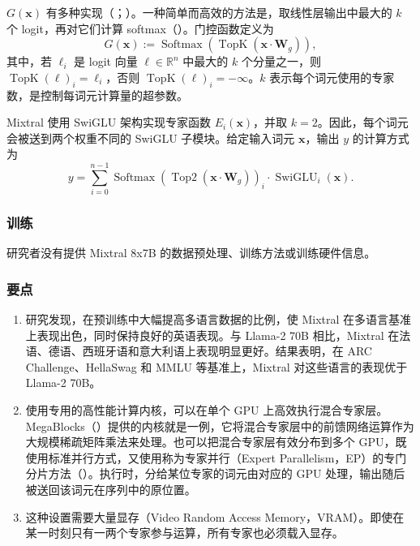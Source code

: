 $G(\symbf{x})$ 有多种实现（；）。一种简单而高效的方法是，取线性层输出中最大的 $k$ 个 logit，再对它们计算 softmax（）。门控函数定义为
\begin{equation}
G(\symbf{x}):=\operatorname{Softmax}(\operatorname{TopK}(\symbf{x}\cdot\symbf{W}_g)),
\tag{2.40}
\end{equation}
其中，若 $\ell_i$ 是 logit 向量 $\ell\in\mathbb{R}^{n}$ 中最大的 $k$ 个分量之一，则 $\operatorname{TopK}(\ell)_i=\ell_i$，否则 $\operatorname{TopK}(\ell)_i=-\infty$。$k$ 表示每个词元使用的专家数，是控制每词元计算量的超参数。

Mixtral 使用 SwiGLU 架构实现专家函数 $E_i(\symbf{x})$，并取 $k=2$。因此，每个词元会被送到两个权重不同的 SwiGLU 子模块。给定输入词元 $\symbf{x}$，输出 $y$ 的计算方式为
\begin{equation}
y=\sum_{i=0}^{n-1}\operatorname{Softmax}(\operatorname{Top2}(\symbf{x}\cdot\symbf{W}_g))_i
\cdot\operatorname{SwiGLU}_i(\symbf{x}).
\tag{2.41}
\end{equation}

\subsubsection{训练}
研究者没有提供 Mixtral 8x7B 的数据预处理、训练方法或训练硬件信息。

\subsubsection{要点}
\begin{keypoint}
\begin{enumerate}
\item 研究发现，在预训练中大幅提高多语言数据的比例，使 Mixtral 在多语言基准上表现出色，同时保持良好的英语表现。与 Llama-2 70B 相比，Mixtral 在法语、德语、西班牙语和意大利语上表现明显更好。结果表明，在 ARC Challenge、HellaSwag 和 MMLU 等基准上，Mixtral 对这些语言的表现优于 Llama-2 70B。
\item 使用专用的高性能计算内核，可以在单个 GPU 上高效执行混合专家层。MegaBlocks（）提供的内核就是一例，它将混合专家层中的前馈网络运算作为大规模稀疏矩阵乘法来处理。也可以把混合专家层有效分布到多个 GPU，既使用标准并行方式，又使用称为专家并行（Expert Parallelism，EP）的专门分片方法（）。执行时，分给某位专家的词元由对应的 GPU 处理，输出随后被送回该词元在序列中的原位置。
\item 这种设置需要大量显存（Video Random Access Memory，VRAM）。即使在某一时刻只有一两个专家参与运算，所有专家也必须载入显存。
\end{enumerate}
\end{keypoint}

